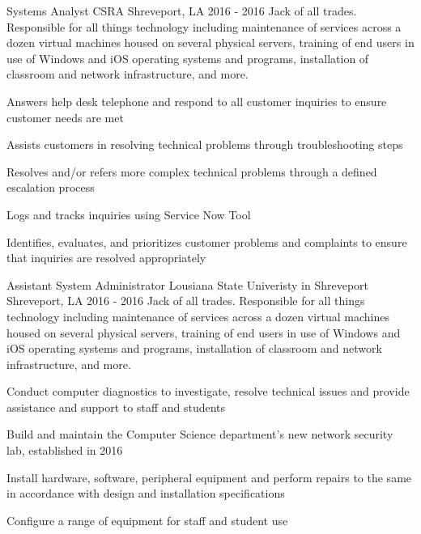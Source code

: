 \begin{cventries}
  \cventrysix
    {Systems Analyst} %
    {CSRA} %
    {Shreveport, LA} %
    {2016 - 2016} %
    {Jack of all trades.  Responsible for all things technology including maintenance of services across a dozen virtual machines housed on several physical servers, training of end users in use of Windows and iOS operating systems and programs, installation of classroom and network infrastructure, and more.} %
    {
      \begin{cvitems} %
        \item {Answers help desk telephone and respond to all customer inquiries to ensure customer needs are met}
        \item {Assists customers in resolving technical problems through troubleshooting steps}
        \item {Resolves and/or refers more complex technical problems through a defined escalation process}
        \item {Logs and tracks inquiries using Service Now Tool}
        \item {Identifies, evaluates, and prioritizes customer problems and complaints to ensure that inquiries are resolved appropriately}
      \end{cvitems}
    }

  \cventrysix
    {Assistant System Administrator} %
    {Lousiana State Univeristy in Shreveport} %
    {Shreveport, LA} %
    {2016 - 2016} %
    {Jack of all trades.  Responsible for all things technology including maintenance of services across a dozen virtual machines housed on several physical servers, training of end users in use of Windows and iOS operating systems and programs, installation of classroom and network infrastructure, and more.} %
    {
      \begin{cvitems} %
        \item {Conduct computer diagnostics to investigate, resolve technical issues and provide assistance and support to staff and students}
        \item {Build and maintain the Computer Science department’s new network security lab, established in 2016}
        \item {Install hardware, software, peripheral equipment and perform repairs to the same in accordance with design and installation specifications}
        \item {Configure a range of equipment for staff and student use}
      \end{cvitems}
    }

\end{cventries}
